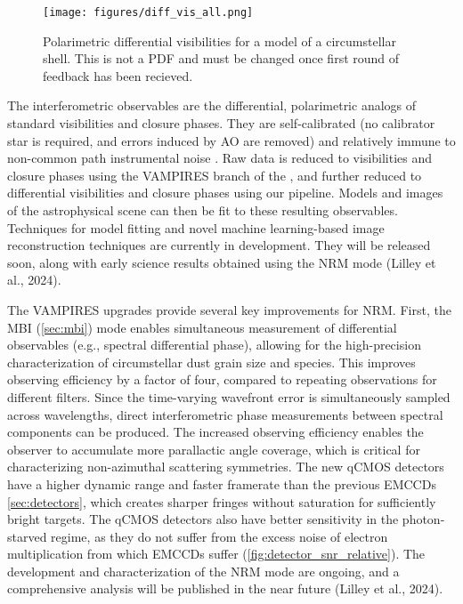 \begin{figure}[h]
\centering
    \texttt{[image: figures/diff\_vis\_all.png]}
    \caption{Polarimetric differential visibilities for a model of a circumstellar shell. This is not a PDF and must be changed once first round of feedback has been recieved. \label{fig:diff_vis_all}}
\end{figure}

The interferometric observables are the differential, polarimetric analogs of standard visibilities and closure phases. They are self-calibrated (no calibrator star is required, and errors induced by AO are removed) and relatively immune to non-common path instrumental noise \citep{norris_vampires_2015}. Raw data is reduced to visibilities and closure phases using the VAMPIRES branch of the \citep{soulain_james_2020}, and further reduced to differential visibilities and closure phases using our pipeline. Models and images of the astrophysical scene can then be fit to these resulting observables. Techniques for model fitting and novel machine learning-based image reconstruction techniques are currently in development. They will be released soon, along with early science results obtained using the NRM mode (Lilley et al., 2024). 
 
The VAMPIRES upgrades provide several key improvements for NRM. First, the MBI (\autoref{sec:mbi}) mode enables simultaneous measurement of differential observables (e.g., spectral differential phase), allowing for the high-precision characterization of circumstellar dust grain size and species. This improves observing efficiency by a factor of four, compared to repeating observations for different filters. Since the time-varying wavefront error is simultaneously sampled across wavelengths, direct interferometric phase measurements between spectral components can be produced. The increased observing efficiency enables the observer to accumulate more parallactic angle coverage, which is critical for characterizing non-azimuthal scattering symmetries. The new qCMOS detectors have a higher dynamic range and faster framerate than the previous EMCCDs \autoref{sec:detectors}, which creates sharper fringes without saturation for sufficiently bright targets. The qCMOS detectors also have better sensitivity in the photon-starved regime, as they do not suffer from the excess noise of electron multiplication from which EMCCDs suffer (\autoref{fig:detector_snr_relative}). 
The development and characterization of the NRM mode are ongoing, and a comprehensive analysis will be published in the near future (Lilley et al., 2024).


